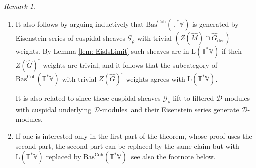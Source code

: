\documentclass{amsart}
\theoremstyle{definition}
\theoremstyle{remark}
\newtheorem{remark}[theorem]{Remark}
\numberwithin{equation}{section}
\newcommand{\der}{\mathrm{der}}
\newcommand{\mc}{\mathcal}
\newcommand{\wh}{\widehat}
\newcommand{\Coh}{\mathrm{Coh}}
\newcommand{\V}{\mathbb{V}}
\newcommand{\T}{\mathbb{T}}
\newcommand{\Bas}{\mathrm{Bas}}
\newcommand{\mrL}{\mathrm{L}}
\begin{document}
\begin{remark}{\label{rem: limbasnonss}}
\begin{enumerate}
    \item It also follows by arguing inductively that $\Bas^\Coh(\T^*\V)$ is generated by Eisenstein series of cuspidal sheaves $\mc G_\rho$ with trivial $(Z(\wh M)\cap \wh{G}_\der)^\circ$-weights. By Lemma \ref{lem: EisIsLimit} such sheaves are in $\mrL (\T^*\V)$ if their $Z(\wh G)^\circ$-weights are trivial, and it follows that the subcategory of $\Bas^\Coh(\T^*\V)$ with trivial $Z(\wh G)^\circ$-weights agrees with $\mrL (\T^*\V)$. 
    
    It is also related to \cite[Conjecture 1.12, Remark 1.13]{PTDolbeault} since these cuspidal sheaves $\mc G_\rho$ lift to filtered $\mc D$-modules with cuspidal underlying $\mc D$-modules, and their Eisenstein series generate $\mc D$-modules. 
    \item If one is interested only in the first part of the theorem, whose proof uses the second part, the second part can be replaced by the same claim but with $\mrL(\T^*\V)$ replaced by $\Bas^\Coh(\T^*\V)$; see also the footnote below.
\end{enumerate}
\end{remark}
\end{document}
